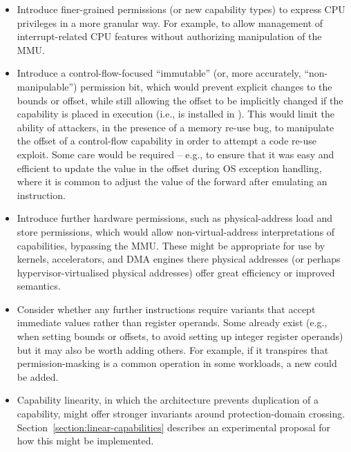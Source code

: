 \begin{itemize}

\item Introduce finer-grained permissions (or new capability types) to express
  CPU privileges in a more granular way.
  For example, to allow management of interrupt-related CPU features without
  authorizing manipulation of the MMU.

\item Introduce a control-flow-focused ``immutable'' (or, more accurately,
  ``non-manipulable'') permission bit, which would prevent explicit changes to
  the bounds or offset, while still allowing the offset to be implicitly
  changed if the capability is placed in execution (i.e., is installed in
  \PCC{}).
  This would limit the ability of attackers, in the presence of a memory
  re-use bug, to manipulate the offset of a control-flow capability in order
  to attempt a code re-use exploit.
  Some care would be required -- e.g., to ensure that it was easy and
  efficient to update the value in the offset during OS exception handling,
  where it is common to adjust the value of the \PC{} forward after emulating
  an instruction.

\item Introduce further hardware permissions, such as physical-address load
  and store permissions, which would allow non-virtual-address interpretations
  of capabilities, bypassing the MMU.
  These might be appropriate for use by kernels, accelerators, and DMA engines
  there physical addresses (or perhaps hypervisor-virtualised physical
  addresses) offer great efficiency or improved semantics.

\item Consider whether any further instructions require variants that accept
  immediate values rather than register operands.
  Some already exist (e.g., when setting bounds or offsets, to avoid setting
  up integer register operands) but it may also be worth adding others.
  For example, if it transpires that permission-masking is a common operation
  in some workloads, a new  could be added.

\item Capability linearity, in which the architecture prevents duplication of
  a capability, might offer stronger invariants around protection-domain
  crossing.
  Section~\ref{section:linear-capabilities} describes an experimental proposal
  for how this might be implemented.


\end{itemize}
